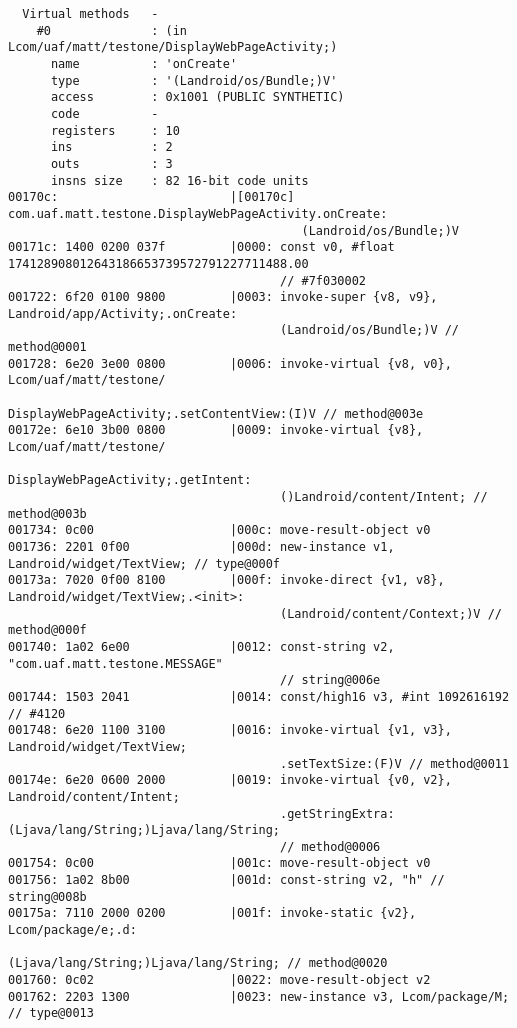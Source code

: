 \begin{lstlisting}
  Virtual methods   -
    #0              : (in Lcom/uaf/matt/testone/DisplayWebPageActivity;)
      name          : 'onCreate'
      type          : '(Landroid/os/Bundle;)V'
      access        : 0x1001 (PUBLIC SYNTHETIC)
      code          -
      registers     : 10
      ins           : 2
      outs          : 3
      insns size    : 82 16-bit code units
00170c:                        |[00170c] com.uaf.matt.testone.DisplayWebPageActivity.onCreate:
                                         (Landroid/os/Bundle;)V
00171c: 1400 0200 037f         |0000: const v0, #float 174128908012643186653739572791227711488.00
                                      // #7f030002
001722: 6f20 0100 9800         |0003: invoke-super {v8, v9}, Landroid/app/Activity;.onCreate:
                                      (Landroid/os/Bundle;)V // method@0001
001728: 6e20 3e00 0800         |0006: invoke-virtual {v8, v0}, Lcom/uaf/matt/testone/
                                      DisplayWebPageActivity;.setContentView:(I)V // method@003e
00172e: 6e10 3b00 0800         |0009: invoke-virtual {v8}, Lcom/uaf/matt/testone/
                                      DisplayWebPageActivity;.getIntent:
                                      ()Landroid/content/Intent; // method@003b
001734: 0c00                   |000c: move-result-object v0
001736: 2201 0f00              |000d: new-instance v1, Landroid/widget/TextView; // type@000f
00173a: 7020 0f00 8100         |000f: invoke-direct {v1, v8}, Landroid/widget/TextView;.<init>:
                                      (Landroid/content/Context;)V // method@000f
001740: 1a02 6e00              |0012: const-string v2, "com.uaf.matt.testone.MESSAGE"
                                      // string@006e
001744: 1503 2041              |0014: const/high16 v3, #int 1092616192 // #4120
001748: 6e20 1100 3100         |0016: invoke-virtual {v1, v3}, Landroid/widget/TextView;
                                      .setTextSize:(F)V // method@0011
00174e: 6e20 0600 2000         |0019: invoke-virtual {v0, v2}, Landroid/content/Intent;
                                      .getStringExtra:(Ljava/lang/String;)Ljava/lang/String;
                                      // method@0006
001754: 0c00                   |001c: move-result-object v0
001756: 1a02 8b00              |001d: const-string v2, "h" // string@008b
00175a: 7110 2000 0200         |001f: invoke-static {v2}, Lcom/package/e;.d:
                                      (Ljava/lang/String;)Ljava/lang/String; // method@0020
001760: 0c02                   |0022: move-result-object v2
001762: 2203 1300              |0023: new-instance v3, Lcom/package/M; // type@0013

\end{lstlisting}
